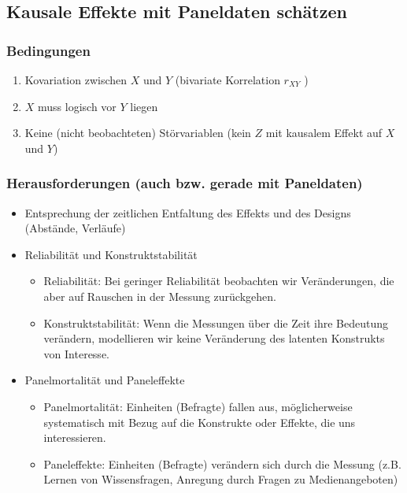 \documentclass[
]{book}
\providecommand{\tightlist}{%
  \setlength{\itemsep}{0pt}\setlength{\parskip}{0pt}}
\begin{document}
\hypertarget{kausale-effekte-mit-paneldaten-schuxe4tzen}{%
\subsection*{Kausale Effekte mit Paneldaten schätzen}\label{kausale-effekte-mit-paneldaten-schuxe4tzen}}

\hypertarget{bedingungen}{%
\subsubsection*{Bedingungen}\label{bedingungen}}

\begin{enumerate}
\def\labelenumi{\arabic{enumi}.}
\tightlist
\item
  Kovariation zwischen \(X\) und \(Y\) (bivariate Korrelation \(r_{XY}\) )
\item
  \(X\) muss logisch vor \(Y\) liegen
\item
  Keine (nicht beobachteten) Störvariablen (kein \(Z\) mit kausalem Effekt auf \(X\) und \(Y\))
\end{enumerate}

\hypertarget{herausforderungen-auch-bzw.-gerade-mit-paneldaten}{%
\subsubsection*{Herausforderungen (auch bzw. gerade mit Paneldaten)}\label{herausforderungen-auch-bzw.-gerade-mit-paneldaten}}

\begin{itemize}
\tightlist
\item
  Entsprechung der zeitlichen Entfaltung des Effekts und des Designs (Abstände, Verläufe)
\item
  Reliabilität und Konstruktstabilität

  \begin{itemize}
  \tightlist
  \item
    Reliabilität: Bei geringer Reliabilität beobachten wir Veränderungen, die aber auf Rauschen in der Messung zurückgehen.
  \item
    Konstruktstabilität: Wenn die Messungen über die Zeit ihre Bedeutung verändern, modellieren wir keine Veränderung des latenten Konstrukts von Interesse.
  \end{itemize}
\item
  Panelmortalität und Paneleffekte

  \begin{itemize}
  \tightlist
  \item
    Panelmortalität: Einheiten (Befragte) fallen aus, möglicherweise systematisch mit Bezug auf die Konstrukte oder Effekte, die uns interessieren.
  \item
    Paneleffekte: Einheiten (Befragte) verändern sich durch die Messung (z.B. Lernen von Wissensfragen, Anregung durch Fragen zu Medienangeboten)
  \end{itemize}
\end{itemize}
\end{document}
